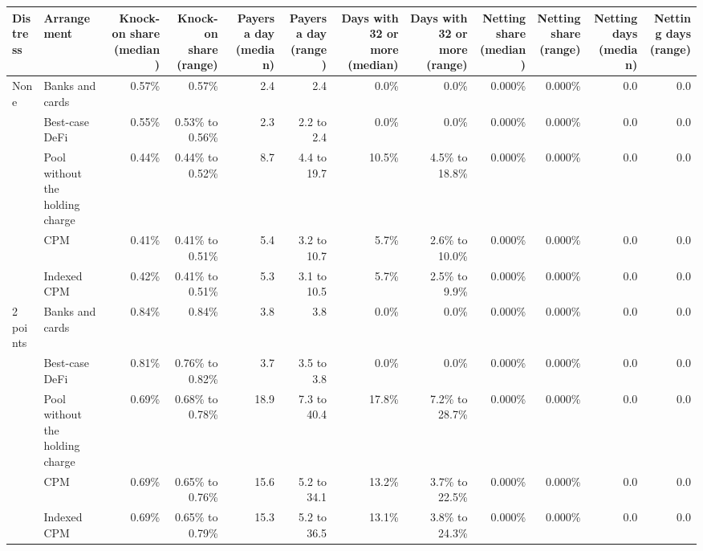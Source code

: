 \begin{tabular}{llrrrrrrrrrr}
\toprule
Distress & Arrangement & Knock-on share (median) & Knock-on share (range) & Payers a day (median) & Payers a day (range) & Days with 32 or more (median) & Days with 32 or more (range) & Netting share (median) & Netting share (range) & Netting days (median) & Netting days (range) \\
\midrule
None & Banks and cards & 0.57\% & 0.57\% & 2.4 & 2.4 & 0.0\% & 0.0\% & 0.000\% & 0.000\% & 0.0 & 0.0 \\
 & Best-case DeFi & 0.55\% & 0.53\% to 0.56\% & 2.3 & 2.2 to 2.4 & 0.0\% & 0.0\% & 0.000\% & 0.000\% & 0.0 & 0.0 \\
 & Pool without the holding charge & 0.44\% & 0.44\% to 0.52\% & 8.7 & 4.4 to 19.7 & 10.5\% & 4.5\% to 18.8\% & 0.000\% & 0.000\% & 0.0 & 0.0 \\
 & CPM & 0.41\% & 0.41\% to 0.51\% & 5.4 & 3.2 to 10.7 & 5.7\% & 2.6\% to 10.0\% & 0.000\% & 0.000\% & 0.0 & 0.0 \\
 & Indexed CPM & 0.42\% & 0.41\% to 0.51\% & 5.3 & 3.1 to 10.5 & 5.7\% & 2.5\% to 9.9\% & 0.000\% & 0.000\% & 0.0 & 0.0 \\
\midrule
2 points & Banks and cards & 0.84\% & 0.84\% & 3.8 & 3.8 & 0.0\% & 0.0\% & 0.000\% & 0.000\% & 0.0 & 0.0 \\
 & Best-case DeFi & 0.81\% & 0.76\% to 0.82\% & 3.7 & 3.5 to 3.8 & 0.0\% & 0.0\% & 0.000\% & 0.000\% & 0.0 & 0.0 \\
 & Pool without the holding charge & 0.69\% & 0.68\% to 0.78\% & 18.9 & 7.3 to 40.4 & 17.8\% & 7.2\% to 28.7\% & 0.000\% & 0.000\% & 0.0 & 0.0 \\
 & CPM & 0.69\% & 0.65\% to 0.76\% & 15.6 & 5.2 to 34.1 & 13.2\% & 3.7\% to 22.5\% & 0.000\% & 0.000\% & 0.0 & 0.0 \\
 & Indexed CPM & 0.69\% & 0.65\% to 0.79\% & 15.3 & 5.2 to 36.5 & 13.1\% & 3.8\% to 24.3\% & 0.000\% & 0.000\% & 0.0 & 0.0 \\
\bottomrule
\end{tabular}
